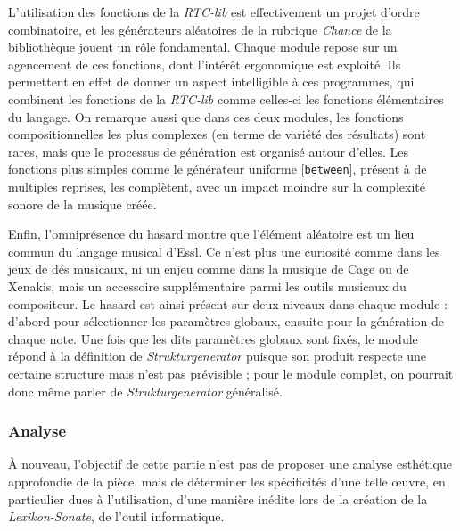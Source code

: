 \documentclass[a4paper,12pt]{article}
\newcommand{\patch}[1]{[\texttt{#1}]}
\begin{document}
L'utilisation des fonctions de la \emph{RTC-lib} est effectivement un projet d'ordre combinatoire, et les générateurs aléatoires de la rubrique \emph{Chance} de la bibliothèque jouent un rôle fondamental. Chaque module repose sur un agencement de ces fonctions, dont l'intérêt ergonomique est exploité. Ils permettent en effet de donner un aspect intelligible à ces programmes, qui combinent les fonctions de la \emph{RTC-lib} comme celles-ci les fonctions élémentaires du langage. On remarque aussi que dans ces deux modules, les fonctions compositionnelles les plus complexes (en terme de variété des résultats) sont rares, mais que le processus de génération est organisé autour d'elles. Les fonctions plus simples comme le générateur uniforme \patch{between}, présent à de multiples reprises, les complètent, avec un impact moindre sur la complexité sonore de la musique créée.

Enfin, l'omniprésence du hasard montre que l'élément aléatoire est un lieu commun du langage musical d'Essl. Ce n'est plus une curiosité comme dans les jeux de dés musicaux, ni un enjeu comme dans la musique de Cage ou de Xenakis, mais un accessoire supplémentaire parmi les outils musicaux du compositeur. Le hasard est ainsi présent sur deux niveaux dans chaque module : d'abord pour sélectionner les paramètres globaux, ensuite pour la génération de chaque note. Une fois que les dits paramètres globaux sont fixés, le module répond à la définition de \emph{Strukturgenerator} puisque son produit respecte une certaine structure mais n'est pas prévisible ; pour le module complet, on pourrait donc même parler de \emph{Strukturgenerator} généralisé.

\subsubsection{Analyse}
\label{lsanalyse}

À nouveau, l'objectif de cette partie n'est pas de proposer une analyse esthétique approfondie de la pièce, mais de déterminer les spécificités d'une telle œuvre, en particulier dues à l'utilisation, d'une manière inédite lors de la création de la \emph{Lexikon-Sonate}, de l'outil informatique.
\end{document}
